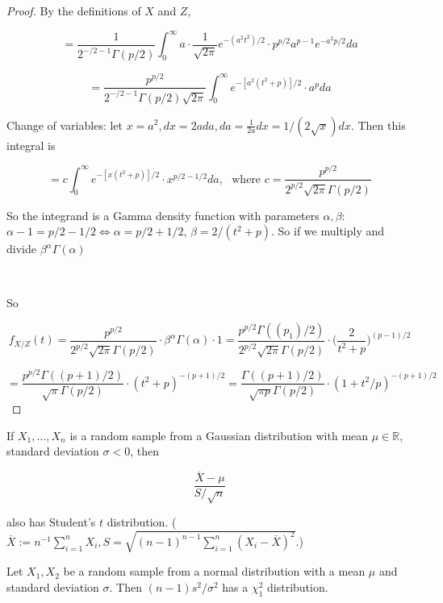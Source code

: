 \begin{proof}
By the definitions of \(X\) and \(Z\), 

\[
= \frac{1}{2^{-/2-1} \Gamma(p/2)}\int_0^\infty a  \cdot \frac{1}{\sqrt{2 \pi}} e^{-(a^2t^2)/2} \cdot p^{p/2} a^{p-1} e^{-a^2p/2}  da
\]

\[
= \frac{p^{p/2} }{2^{-/2-1} \Gamma(p/2) \sqrt{2 \pi}}\int_0^\infty   e^{-[a^2(t^2 + p)]/2} \cdot a^{p}  da
\]

Change of variables: let \(x = a^2, dx = 2ada, da= \frac{1}{2a} dx = 1/(2 \sqrt{x}) dx\). Then this integral is

\[
= c \int_0^\infty   e^{-[x(t^2 + p)]/2} \cdot x^{p/2 - 1/2}  da, \ \ \ \text{where } c = \frac{p^{p/2}}{2^{p/2} \sqrt{2 \pi} \Gamma(p/2)}
\]

So the integrand is a Gamma density function with parameters \(\alpha, \beta\): \(\alpha  - 1 = p/2 - 1/2 \iff \alpha = p/2 + 1/2\), \(\beta = 2/(t^2 + p)\). So if we multiply and divide \(\beta^\alpha \Gamma(\alpha)\)

\

So

\[
f_{X/Z}(t) = \frac{p^{p/2}}{2^{p/2} \sqrt{2 \pi} \Gamma(p/2)} \cdot \beta^\alpha \Gamma(\alpha) \cdot 1 = \frac{p^{p/2} \Gamma((p_1)/2)}{2^{p/2} \sqrt{2 \pi} \Gamma(p/2)} \cdot \bigg( \frac{2}{t^2 + p} \bigg)^{(p-1)/2}
\]

\[
= \frac{p^{p/2} \Gamma((p+1)/2)}{\sqrt{\pi} \Gamma(p/2)} \cdot (t^2 + p)^{-(p+1)/2} = \frac{\Gamma((p+1)/2)}{\sqrt{\pi p} \Gamma(p/2)} \cdot (1 + t^2/p)^{-(p+1)/2}
\]




\end{proof}

\begin{remark} If \(X_1, \ldots, X_n\) is a random sample from a Gaussian distribution with mean \(\mu \in \mathbb{R}\), standard deviation \(\sigma < 0\), then

\[
\frac{\overline{X} - \mu}{S / \sqrt{n}}
\]

also has Student's \(t\) distribution. (\(\overline{X} := n^{-1} \sum_{i=1}^n X_i, S = \sqrt{(n-1)^{n-1} \sum_{i=1}^n (X_i - \overline{X})^2}\).)

\end{remark}

\begin{proposition} Let \(X_1, X_2\) be a random sample from a normal distribution with a mean \(\mu\) and standard deviation \(\sigma\). Then \((n-1)s^2/\sigma^2\) has a \(\chi_1^2\) distribution.

\end{proposition}

